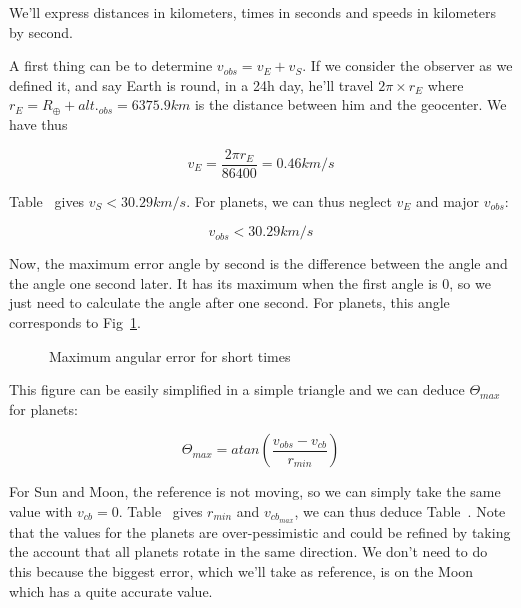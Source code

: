 We'll express distances in kilometers, times in seconds and speeds in kilometers by second.

A first thing can be to determine $v_{obs}=v_E+v_S$. If we consider the observer as we defined it, and say Earth is round, in a 24h day, he'll travel $2\pi\times r_{E}$ where $r_{E}=R_\oplus+alt._{obs}=6375.9km$ is the distance between him and the geocenter. We have thus 

\begin{equation}
v_E = \frac{2\pi r_E}{86400} = 0.46km/s
\end{equation}

Table~\cite{table:planetvalues} gives $v_S < 30.29 km/s$. For planets, we can thus neglect $v_E$ and major $v_{obs}$:

\begin{equation}
v_{obs} < 30.29 km/s
\end{equation}

Now, the maximum error angle by second is the difference between the angle and the angle one second later. It has its maximum when the first angle is 0, so we just need to calculate the angle after one second. For planets, this angle corresponds to Fig~\ref{maxangularerror}.

\begin{figure}
\centering
{}
\caption{Maximum angular error for short times}\label{maxangularerror}
\end{figure}

This figure can be easily simplified in a simple triangle and we can deduce $\Theta_{max}$ for planets:

\begin{equation}
\Theta_{max}=atan(\frac{v_{obs}-v_{cb}}{r_{min}})
\end{equation}

For Sun and Moon, the reference is not moving, so we can simply take the same value with $v_{cb}=0$. Table~\cite{table:planetvalues} gives $r_{min}$ and $v_{cb_{max}}$, we can thus deduce Table~\cite{table:thetamaxtime}. Note that the values for the planets are over-pessimistic and could be refined by taking the account that all planets rotate in the same direction. We don't need to do this because the biggest error, which we'll take as reference, is on the Moon which has a quite accurate value.

